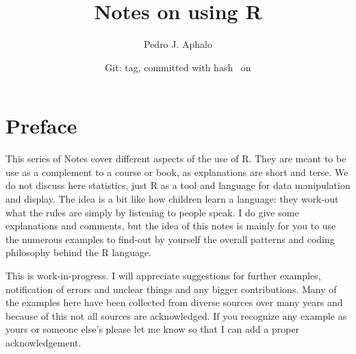 \documentclass[paper=a4,10pt,div=17,headsepline,BCOR=12mm,twoside,open=right]{scrbook}\usepackage{knitr}
\title{Notes on using R}
\author{Pedro J. Aphalo}
\date{Git: tag\gitVtagn , committed with hash \gitAbbrevHash\ on \gitAuthorIsoDate}
\begin{document}











\maketitle


\tableofcontents




\chapter*{Preface}

This series of Notes cover different aspects of the use of R. They are meant to be use as a complement to a course or book, as explanations
are short and terse. We do not discuss here statistics, just R as a tool and language for data manipulation and display. The idea is a bit like how children learn a language: they work-out what the rules are simply by listening to people speak. I do give some explanations and comments, but the idea of this notes is mainly for you to use the numerous examples to find-out by yourself the overall patterns and coding philosophy behind the R language.

This is work-in-progress. I will appreciate suggestions for further examples, notification of errors and unclear things and any bigger contributions. Many of the examples here have been collected from diverse sources over many years and because of this not all sources are acknowledged. If you recognize any example as yours or someone else's please let me know so that I can add a proper acknowledgement.










\end{document}
